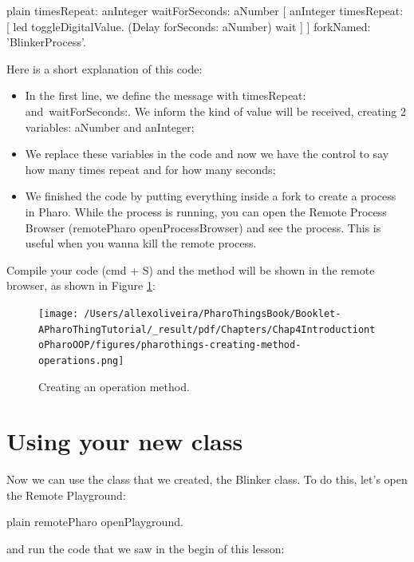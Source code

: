 \documentclass[10pt,twoside,english]{_support/latex/sbabook/sbabook}
\begin{document}
\begin{displaycode}{plain}
timesRepeat: anInteger waitForSeconds: aNumber
    [ anInteger timesRepeat: [  
        led toggleDigitalValue. 
        (Delay forSeconds: aNumber) wait  
    ] ] forkNamed: 'BlinkerProcess'.
\end{displaycode}

Here is a short explanation of this code:

\begin{itemize}
\item In the first line, we define the message with timesRepeat: and waitForSeconds:. We inform the kind of value will be received, creating 2 variables: aNumber and anInteger;
\item We replace these variables in the code and now we have the control to say how many times repeat and for how many seconds;
\item We finished the code by putting everything inside a fork to create a process in Pharo. While the process is running, you can open the Remote Process Browser (remotePharo openProcessBrowser) and see the process. This is useful when you wanna kill the remote process.
\end{itemize}

Compile your code (cmd + S) and  the method will be shown in the remote browser, as shown in Figure \ref{OperationsMethod}:


\begin{figure}

\begin{center}
\texttt{[image: /Users/allexoliveira/PharoThingsBook/Booklet-APharoThingTutorial/\_result/pdf/Chapters/Chap4IntroductiontoPharoOOP/figures/pharothings-creating-method-operations.png]}\caption{Creating an operation method.\label{OperationsMethod}}\end{center}
\end{figure}

\section{Using your new class}
Now we can use the class that we created, the Blinker class. To do this, let's open the Remote Playground:

\begin{displaycode}{plain}
remotePharo openPlayground.
\end{displaycode}

and run the code that we saw in the begin of this lesson:
\end{document}
